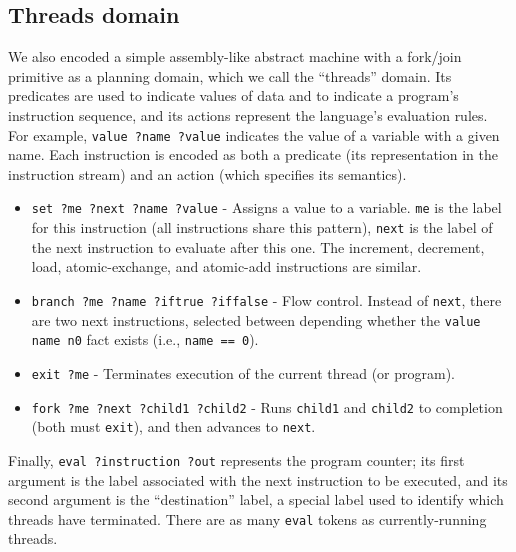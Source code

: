 \subsection{Threads domain}

We also encoded a simple assembly-like abstract machine with a fork/join primitive as a planning domain, which we call the ``threads'' domain.
Its predicates are used to indicate values of data and to indicate a program's instruction sequence, and
its actions represent the language's evaluation rules. For example, \texttt{value ?name ?value} indicates the value of a variable with a given name. Each instruction is encoded as both a predicate (its representation in the instruction stream) and an action (which specifies its semantics).
%
\begin{itemize}
	\item \texttt{set ?me ?next ?name ?value} - Assigns a value to a variable. \texttt{me} is the label for this instruction (all instructions share this pattern), \texttt{next} is the label of the next instruction to evaluate after this one. The increment, decrement, load, atomic-exchange, and atomic-add instructions are similar.
	\item \texttt{branch ?me ?name ?iftrue ?iffalse} - Flow control. Instead of \texttt{next}, there are two next instructions, selected between depending whether the \texttt{value name n0} fact exists (i.e., \texttt{name == 0}).
	\item \texttt{exit ?me} - Terminates execution of the current thread (or program).
	\item \texttt{fork ?me ?next ?child1 ?child2} - Runs \texttt{child1} and \texttt{child2} to completion (both must \texttt{exit}), and then advances to \texttt{next}.
\end{itemize}
%
Finally, \texttt{eval ?instruction ?out} represents the program counter; its first argument is the label associated with the next instruction to be executed, and its second argument is the ``destination'' label, a special label used to identify which threads have terminated. There are as many \texttt{eval} tokens as currently-running threads.

